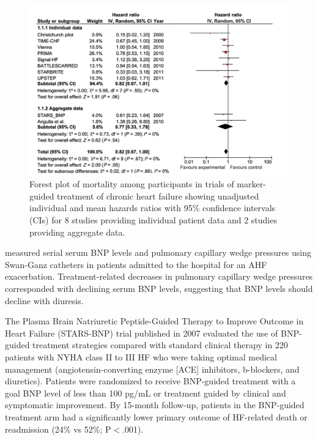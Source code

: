 \documentclass[14pt,a4paper,onecolumn]{extarticle}
\begin{document}
\begin{figure}   \includegraphics{../../images/NP_treatment.png}   \caption{Forest plot of mortality among participants in trials of marker-guided treatment of chronic heart failure showing unadjusted individual and mean hazards ratios with 95\% confidence intervals (CIs) for 8 studies providing individual patient data and 2 studies providing aggregate data. \citep{Troughton2014}}   \label{NP_treatment} \end{figure}

\citep{Kazanegra2001} measured serial serum BNP levels and pulmonary capillary wedge pressures using Swan-Ganz catheters in patients admitted to the hospital for an AHF exacerbation. Treatment-related decreases in pulmonary capillary wedge pressures corresponded with declining serum BNP levels, suggesting that BNP levels should decline with diuresis. %

The Plasma Brain Natriuretic Peptide-Guided Therapy to Improve Outcome in Heart Failure (STARS-BNP) trial published in 2007 evaluated the use of BNP-guided treatment strategies compared with standard clinical therapy in 220 patients with NYHA class II to III HF who were taking optimal medical management (angiotensin-converting enzyme [ACE] inhibitors, b-blockers, and diuretics). Patients were randomized to receive BNP-guided treatment with a goal BNP level of less than 100 pg/mL or treatment guided by clinical and symptomatic improvement. By 15-month follow-up, patients in the BNP-guided treatment arm had a significantly lower primary outcome of HF-related death or readmission (24\% vs 52\%; P$<$.001). \citep{Jourdain2007} %
\end{document}
